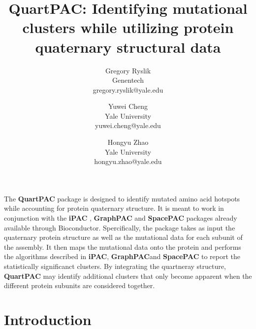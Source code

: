 \documentclass{article}
\def \GraphPAC{\textbf{GraphPAC}}
\def \iPAC{\textbf{iPAC}}
\def \SpacePAC{\textbf{SpacePAC}}
\def \QuartPAC{\textbf{QuartPAC}}
\begin{document}


  \title{\QuartPAC{}: Identifying mutational clusters while utilizing protein quaternary structural data }
  \author{Gregory Ryslik  \\ Genentech  \\ gregory.ryslik@yale.edu
        \and
          Yuwei Cheng  \\ Yale University \\ yuwei.cheng@yale.edu
          \and
            Hongyu Zhao \\ Yale University \\ hongyu.zhao@yale.edu}

\maketitle

\begin{abstract}
  
\end{abstract}

  The \QuartPAC{} package is designed to identify mutated amino acid hotspots while accounting for protein quaternary structure. It is meant to work in conjunction with the \iPAC{} \citep{iPAC}, \GraphPAC{} \citep{GraphPAC} and \SpacePAC{} \citep{SpacePAC} packages already available through Bioconductor. Spercifically, the package takes as input the quaternary protein structure as well as the mutational data for each subunit of the assembly. It then maps the mutational data onto the protein and performs the algorithms described in \iPAC{}, \GraphPAC and \SpacePAC{} to report the statistically significanct clusters. By integrating the quartneray structure, \QuartPAC{} may identify additional clusters that only become apparent when the different protein subunits are considered together.
  
  

\section{Introduction} \label{intro}
\end{document}
